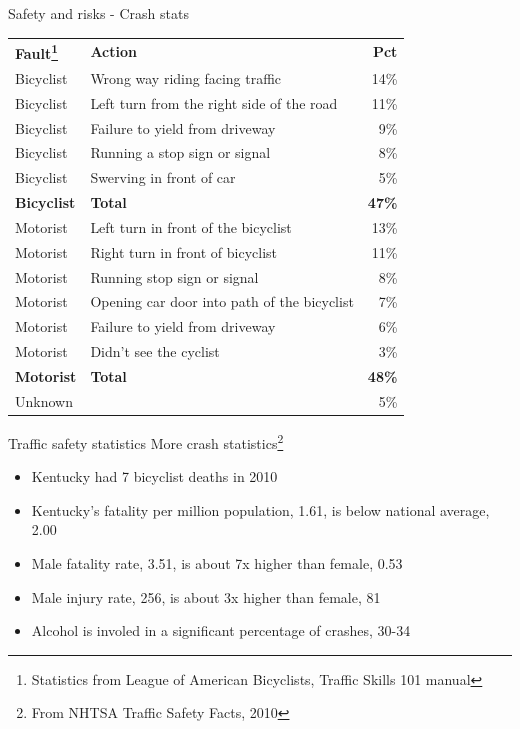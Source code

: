 \documentclass[t]{beamer}
\begin{document}
\begin{frame}{Safety and risks - Crash stats}
  \begin{tabular}{llr}
    {\bf Fault\footnote{Statistics from League of American Bicyclists, Traffic Skills 101 manual}}&{\bf Action}&{\bf Pct}\\
    Bicyclist & Wrong way riding facing traffic & 14\% \\
    Bicyclist & Left turn from the right side of the road & 11\% \\
    Bicyclist & Failure to yield from driveway & 9\% \\
    Bicyclist & Running a stop sign or signal & 8\% \\
    Bicyclist & Swerving in front of car & 5\% \\
    {\bf Bicyclist}&{\bf Total}&{\bf 47\%}\\
    Motorist  & Left turn in front of the bicyclist & 13\% \\
    Motorist  & Right turn in front of bicyclist & 11\% \\
    Motorist&Running stop sign or signal& 8\%\\
    Motorist  & Opening car door into path of the bicyclist & 7\% \\
    Motorist  &Failure to yield from driveway& 6\%\\
    Motorist&Didn't see the cyclist& 3\%\\
    {\bf Motorist}&{\bf Total}&{\bf 48\%}\\
    Unknown & & 5\% \\
  \end{tabular}
\end{frame}

\begin{frame}{Traffic safety statistics}
  More crash statistics\footnote{From NHTSA Traffic Safety Facts, 2010}
  \begin{itemize}
    \item Kentucky had 7 bicyclist deaths in 2010
    \item Kentucky's fatality per million population, 1.61, is below national average, 2.00
    \item Male fatality rate, 3.51, is about 7x higher than female, 0.53
    \item Male injury rate, 256, is about 3x higher than female, 81
    \item Alcohol is involed in a significant percentage of crashes, 30-34%
  \end{itemize}
\end{frame}
\end{document}
